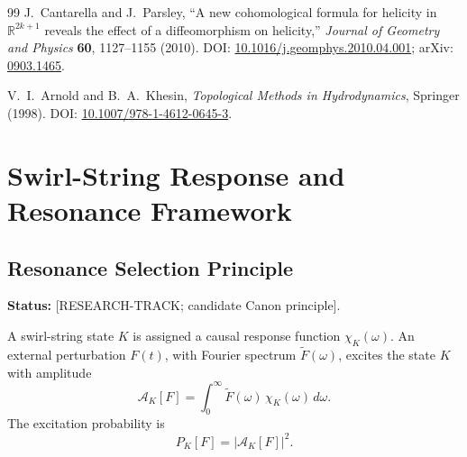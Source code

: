 \begin{thebibliography}{99}
J.~Cantarella and J.~Parsley,
``A new cohomological formula for helicity in $\mathbb R^{2k+1}$ reveals the effect of a diffeomorphism on helicity,''
\emph{Journal of Geometry and Physics} \textbf{60}, 1127--1155 (2010).
DOI: \href{https://doi.org/10.1016/j.geomphys.2010.04.001}{10.1016/j.geomphys.2010.04.001};
arXiv: \href{https://arxiv.org/abs/0903.1465}{0903.1465}.

V.~I.~Arnold and B.~A.~Khesin,
\emph{Topological Methods in Hydrodynamics},
Springer (1998).
DOI: \href{https://doi.org/10.1007/978-1-4612-0645-3}{10.1007/978-1-4612-0645-3}.

\end{thebibliography}
\fi



\providecommand{\vswirl}{\mathbf{v}_{\!\boldsymbol{\circlearrowleft}}}
\providecommand{\vnorm}{\lVert \mathbf{v}_{\!\boldsymbol{\circlearrowleft}}\rVert}
\providecommand{\rhoF}{\rho_{\!f}}
\providecommand{\rhoE}{\rho_{\!E}}
\providecommand{\rhoM}{\rho_{\!m}}
\providecommand{\rhocore}{\rho_{\text{core}}}
\providecommand{\rc}{r_c}
\providecommand{\omC}{\omega_C}
\providecommand{\Fswirlmax}{F_{\text{swirl}}^{\max}}


\section{Swirl-String Response and Resonance Framework}

\subsection{Resonance Selection Principle}
    \label{sec:resonance-selection-principle}
    
    \noindent
    \textbf{Status:} [RESEARCH-TRACK; candidate Canon principle].
    
    A swirl-string state \(K\) is assigned a causal response function
    \(\chi_K(\omega)\). An external perturbation \(F(t)\), with Fourier
    spectrum \(\widetilde F(\omega)\), excites the state \(K\) with amplitude
    \begin{equation}
        \mathcal A_K[F]
        =
        \int_0^\infty
        \widetilde F(\omega)\,
        \chi_K(\omega)\,
        d\omega .
    \end{equation}
    The excitation probability is
    \begin{equation}
        P_K[F]
        =
        |\mathcal A_K[F]|^2 .
    \end{equation}
    
